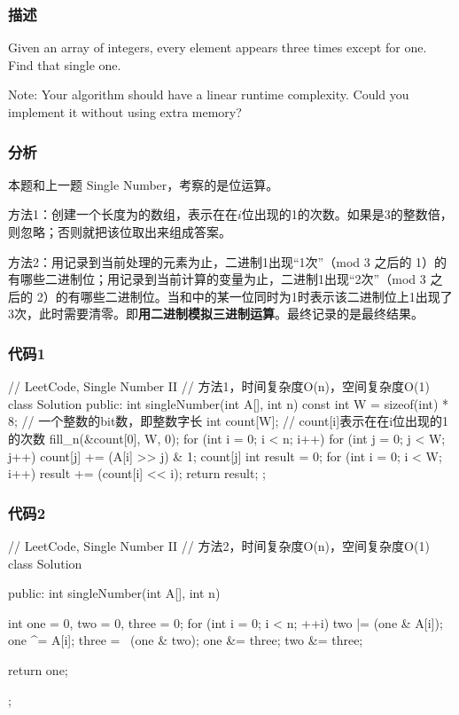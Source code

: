 \subsubsection{描述}
Given an array of integers, every element appears three times except for one. Find that single one.

Note:
Your algorithm should have a linear runtime complexity. Could you implement it without using extra memory?


\subsubsection{分析}
本题和上一题 Single Number，考察的是位运算。

方法1：创建一个长度为的数组，表示在在$i$位出现的1的次数。如果是3的整数倍，则忽略；否则就把该位取出来组成答案。

方法2：用记录到当前处理的元素为止，二进制1出现“1次”（mod 3 之后的 1）的有哪些二进制位；用记录到当前计算的变量为止，二进制1出现“2次”（mod 3 之后的 2）的有哪些二进制位。当和中的某一位同时为1时表示该二进制位上1出现了3次，此时需要清零。即\textbf{用二进制模拟三进制运算}。最终记录的是最终结果。

\subsubsection{代码1}
\begin{Code}
// LeetCode, Single Number II
// 方法1，时间复杂度O(n)，空间复杂度O(1)
class Solution {
public:
    int singleNumber(int A[], int n) {
        const int W = sizeof(int) * 8; // 一个整数的bit数，即整数字长
        int count[W];  // count[i]表示在在i位出现的1的次数
        fill_n(&count[0], W, 0);
        for (int i = 0; i < n; i++) {
            for (int j = 0; j < W; j++) {
                count[j] += (A[i] >> j) & 1;
                count[j] %
            }
        }
        int result = 0;
        for (int i = 0; i < W; i++) {
            result += (count[i] << i);
        }
        return result;
    }
};
\end{Code}


\subsubsection{代码2}
\begin{Code}
// LeetCode, Single Number II
// 方法2，时间复杂度O(n)，空间复杂度O(1)
class Solution {
public:
    int singleNumber(int A[], int n) {
        int one = 0, two = 0, three = 0;
        for (int i = 0; i < n; ++i) {
            two |= (one & A[i]);
            one ^= A[i];
            three = ~(one & two);
            one &= three;
            two &= three;
        }

        return one;
    }
};
\end{Code}


